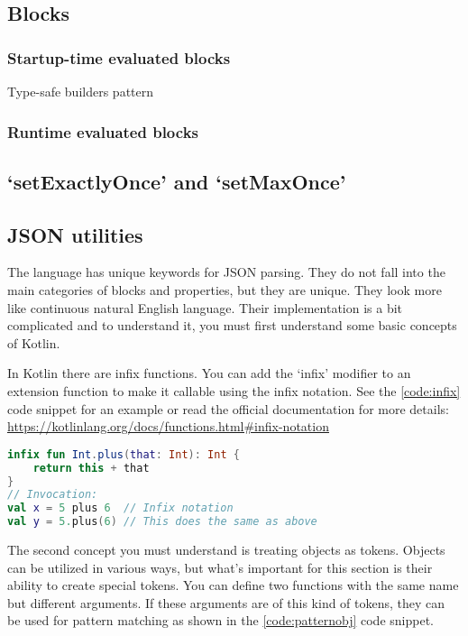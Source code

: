 \subsection{Blocks}

\subsubsection{Startup-time evaluated blocks}

Type-safe builders pattern

\subsubsection{Runtime evaluated blocks}

\subsection{`setExactlyOnce' and `setMaxOnce'}

\subsection{JSON utilities}

The language has unique keywords for JSON parsing. They do not fall into the main categories of blocks and properties, but they are unique. They look more like continuous natural English language. Their implementation is a bit complicated and to understand it, you must first understand some basic concepts of Kotlin.

In Kotlin there are infix functions. You can add the `infix' modifier to an extension function to make it callable using the infix notation. See the \ref{code:infix} code snippet for an example or read the official documentation for more details: \url{https://kotlinlang.org/docs/functions.html#infix-notation}

\begin{lstlisting}[caption={Infix functions},language=Kotlin,label=code:infix]
infix fun Int.plus(that: Int): Int {
    return this + that
}
// Invocation:
val x = 5 plus 6  // Infix notation
val y = 5.plus(6) // This does the same as above
\end{lstlisting}

The second concept you must understand is treating objects as tokens. Objects can be utilized in various ways, but what's important for this section is their ability to create special tokens. You can define two functions with the same name but different arguments. If these arguments are of this kind of tokens, they can be used for pattern matching as shown in the \ref{code:patternobj} code snippet.

